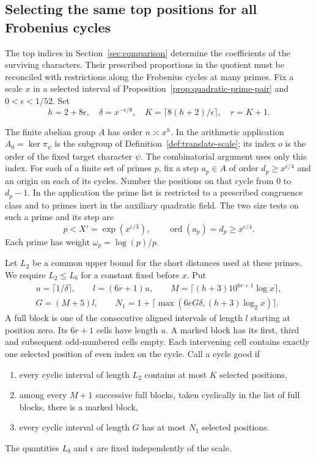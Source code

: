 \subsection{Selecting the same top positions for all Frobenius cycles}
\label{subsec:frobenius-selection}

The top indices in Section~\ref{sec:comparison} determine the coefficients of the surviving characters. Their prescribed proportions in the quotient must be reconciled with restrictions along the Frobenius cycles at many primes. Fix a scale \(x\) in a selected interval
of Proposition~\ref{prop:quadratic-prime-pair} and \(0<\epsilon<1/52\). Set
\[
 h=2+8\epsilon,\quad \delta=x^{-\epsilon/8},\quad
 K=\lceil8(h+2)/\epsilon\rceil,\quad r=K+1 .
\]
\begin{paramdefinition}\label{hyp:frobenius-top-cycle}
The finite abelian group \(A\) has order \(n\asymp x^h\).
In the arithmetic application \(A_0=\ker\pi_\psi\) is the
subgroup of Definition~\ref{def:translate-scale}; its index
\(o\) is the order of the fixed target character \(\psi\).
The combinatorial argument uses only this index. For each of a finite
set of primes \(p\), fix a step \(a_p\in A\) of order
\(d_p\ge x^{\epsilon/4}\) and an origin on each of its
cycles. Number the positions on that cycle from \(0\) to
\(d_p-1\). In the application the prime list is restricted to a prescribed congruence class and to primes inert in the auxiliary quadratic field. The two size tests on such a prime and its step are
\[
 p<X'=\exp(x^{\epsilon/3}),\qquad \operatorname{ord}(a_p)=d_p\ge x^{\epsilon/4}.
\]
Each prime has
weight \(\omega_p=\log(p)/p\).

Let \(L_2\) be a common upper bound for the short distances
used at these primes. We require \(L_2\le L_b\) for a
constant fixed before \(x\). Put
\[
\begin{gathered}
 u=\lceil1/\delta\rceil,\qquad l=(6r+1)u,\qquad
 M=\lceil(h+3)10^{6r+1}\log x\rceil,\\
 G=(M+5)l,\qquad
 N_1=1+\lceil\max(6eG\delta,(h+3)\log_2 x)\rceil .
\end{gathered}
\]
A full block is one of the consecutive aligned intervals
of length \(l\) starting at position zero. Its \(6r+1\)
cells have length \(u\). A marked block has its first,
third and subsequent odd-numbered cells empty. Each
intervening cell contains exactly one selected position
of even index on the cycle. Call a cycle good if

\begin{enumerate}
\item every cyclic interval of length \(L_2\) contains at
most \(K\) selected positions,
\item among every \(M+1\) successive full blocks, taken
cyclically in the list of full blocks, there is a marked block,
\item every cyclic interval of length \(G\) has at most
\(N_1\) selected positions.
\end{enumerate}

The quantities \(L_b\) and \(\epsilon\) are fixed independently of the scale.
\end{paramdefinition}

